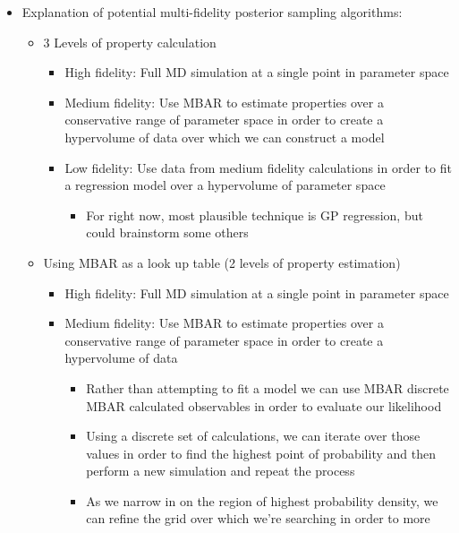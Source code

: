 \documentclass[aps,pre,nofootinbib,superscriptaddress,linenumbers,10pt, draft,tightenlines]{revtex4-1}
\begin{document}
\begin{itemize}
\begin{itemize}
        \item Explanation of potential multi-fidelity posterior sampling algorithms:
        \begin{itemize}
        	\item 3 Levels of property calculation
        	\begin{itemize}
        		\item High fidelity: Full MD simulation at a single point in parameter space
        		\item Medium fidelity: Use MBAR to estimate properties over a conservative range of parameter space in order to create a hypervolume of data
        		      over which we can construct a model
        		\item Low fidelity: Use data from medium fidelity calculations in order to fit a regression model over a hypervolume of parameter space
        		\begin{itemize}
        			\item For right now, most plausible technique is GP regression, but could brainstorm some others
        		\end{itemize}
        	\end{itemize}
            \item Using MBAR as a look up table (2 levels of property estimation)
            \begin{itemize}
            	\item High fidelity: Full MD simulation at a single point in parameter space
            	\item Medium fidelity: Use MBAR to estimate properties over a conservative range of parameter space in order to create a hypervolume of data
            	\begin{itemize}
            		\item Rather than attempting to fit a model we can use MBAR discrete MBAR calculated observables in order to evaluate our likelihood
            		\item Using a discrete set of calculations, we can iterate over those values in order to find the highest point of probability and then 
            		      perform a new simulation and repeat the process
            		\item As we narrow in on the region of highest probability density, we can refine the grid over which we're searching in order to more

\end{itemize}
\end{itemize}
\end{itemize}
\end{itemize}
\end{itemize}
\end{document}
